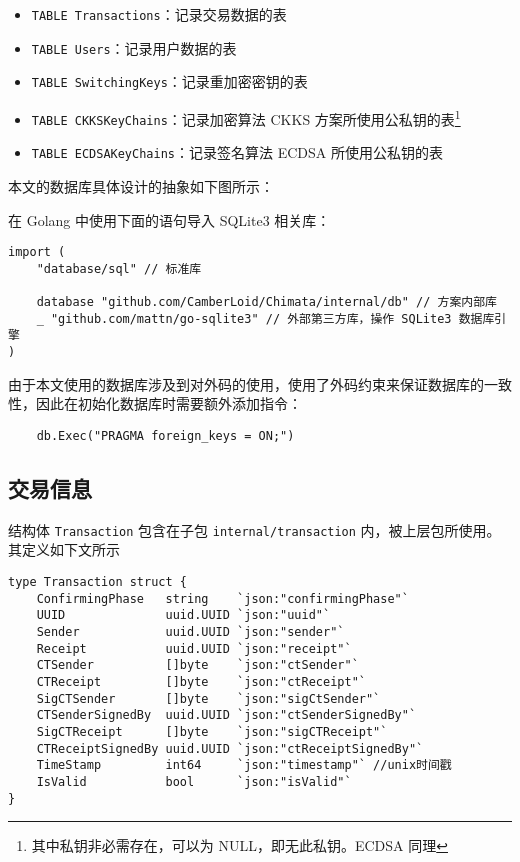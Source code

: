 \begin{itemize}
    \item \verb|TABLE Transactions|：记录交易数据的表
    \item \verb|TABLE Users|：记录用户数据的表
    \item \verb|TABLE SwitchingKeys|：记录重加密密钥的表
    \item \verb|TABLE CKKSKeyChains|：记录加密算法 CKKS 方案所使用公私钥的表\footnote{其中私钥非必需存在，可以为 NULL，即无此私钥。ECDSA 同理}
    \item \verb|TABLE ECDSAKeyChains|：记录签名算法 ECDSA 所使用公私钥的表
\end{itemize}

本文的数据库具体设计的抽象如下图所示：


在 Golang 中使用下面的语句导入 SQLite3 相关库：

\begin{verbatim}
import (
    "database/sql" // 标准库

    database "github.com/CamberLoid/Chimata/internal/db" // 方案内部库
    _ "github.com/mattn/go-sqlite3" // 外部第三方库，操作 SQLite3 数据库引擎
)
\end{verbatim}

由于本文使用的数据库涉及到对外码的使用，使用了外码约束来保证数据库的一致性，因此在初始化数据库时需要额外添加指令：

\begin{verbatim}
    db.Exec("PRAGMA foreign_keys = ON;")
\end{verbatim}
 
\subsection{交易信息}

结构体 \verb|Transaction| 包含在子包 \verb|internal/transaction| 内，被上层包所使用。其定义如下文所示

\begin{verbatim}
type Transaction struct {
    ConfirmingPhase   string    `json:"confirmingPhase"`
    UUID              uuid.UUID `json:"uuid"`
    Sender            uuid.UUID `json:"sender"`
    Receipt           uuid.UUID `json:"receipt"`
    CTSender          []byte    `json:"ctSender"`
    CTReceipt         []byte    `json:"ctReceipt"`
    SigCTSender       []byte    `json:"sigCtSender"`
    CTSenderSignedBy  uuid.UUID `json:"ctSenderSignedBy"`
    SigCTReceipt      []byte    `json:"sigCTReceipt"`
    CTReceiptSignedBy uuid.UUID `json:"ctReceiptSignedBy"`
    TimeStamp         int64     `json:"timestamp"` //unix时间戳
    IsValid           bool      `json:"isValid"`
}    
\end{verbatim}

